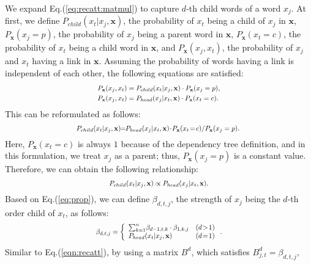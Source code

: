 \documentclass[letterpaper]{article} \usepackage{aaai20}  \usepackage{times}  \usepackage{helvet} \usepackage{courier}  \usepackage[hyphens]{url}  \usepackage{graphicx} \urlstyle{rm} \def\UrlFont{\rm}  \usepackage{graphicx}  \frenchspacing  \setlength{\pdfpagewidth}{8.5in}  \setlength{\pdfpageheight}{11in}  \usepackage{tabu}
\begin{document}
We expand Eq.(\ref{eq:recatt:matmul}) to capture $d$-th child words of a word $x_{j}$.
At first, we define $P_{child}(x_{t}|x_{j},\mathbf{x})$, the probability of $x_{t}$ being a child of $x_{j}$ in $\mathbf{x}$, $P_{\mathbf{x}}(x_{j}=p)$, the probability of $x_{j}$ being a parent word in $\mathbf{x}$, $P_{\mathbf{x}}(x_{t}=c)$, the probability of $x_{t}$ being a child word in $\mathbf{x}$, and $P_{\mathbf{x}}(x_{j}, x_{t})$, the  probability of $x_{j}$ and $x_{t}$ having a link in $\mathbf{x}$.
Assuming the probability of words having a link is independent of each other, the following equations are satisfied: 
\begin{equation}
\scalebox{0.8}{$
\begin{aligned}
    P_{\mathbf{x}}(x_{j}, x_{t}) &= P_{child}(x_{t}|x_{j},\mathbf{x}) \cdot P_{\mathbf{x}}(x_{j}=p),\\
    P_{\mathbf{x}}(x_{j}, x_{t}) &= P_{head}(x_{j}|x_{t},\mathbf{x}) \cdot P_{\mathbf{x}}(x_{t}=c).
\end{aligned}
$}    
\end{equation}
This can be reformulated as follows:
\begin{equation}
\scalebox{0.8}{$
    \!\!\!\!\!\!\!\!P_{child}(x_{t}|x_{j},\mathbf{x}) \!\!=\!\! P_{head}(x_{j}|x_{t},\mathbf{x}) \! \cdot \! P_{\mathbf{x}}(x_{t}\!=\!c) / P_{\mathbf{x}}(x_{j} = p).\!\!\!\!\!\!
$}    
\end{equation}
Here, $P_{\mathbf{x}}(x_{t}=c)$ is always $1$ because of the dependency tree definition, and in this  formulation, we treat $x_{j}$ as a parent;
thus, $P_{\mathbf{x}}(x_{j}=p)$ is a constant value.
Therefore, we can obtain the following relationship:
\begin{equation}
    \scalebox{0.8}{$
    P_{child}(x_{t}|x_{j},\mathbf{x}) \propto P_{head}(x_{j}|x_{t},\mathbf{x}).
    $}
    \label{eq:prop}
\end{equation}
Based on Eq.(\ref{eq:prop}), we can define $\beta_{d,t,j}$, the strength of $x_{j}$ being the $d$-th order child of $x_{t}$, as follows:
\begin{equation}
\scalebox{0.8}{$
\beta_{d,t,j} = \left\{\begin{array}{ll}
{\textstyle\sum}_{k=1}^{n}\beta_{d-1,t,k} \cdot \beta_{1,k,j} & (d \! > \! 1) \\
P_{head}(x_{t}|x_{j},\mathbf{x}) & (d \! = \! 1)
\end{array} \right..
$}
\label{eqn:recatt:trans}
\end{equation}
Similar to Eq.(\ref{eqn:recatt}), by using a matrix $B^{d}$, which satisfies $B^{d}_{j,t} = \beta_{d,t,j}$,
\end{document}
